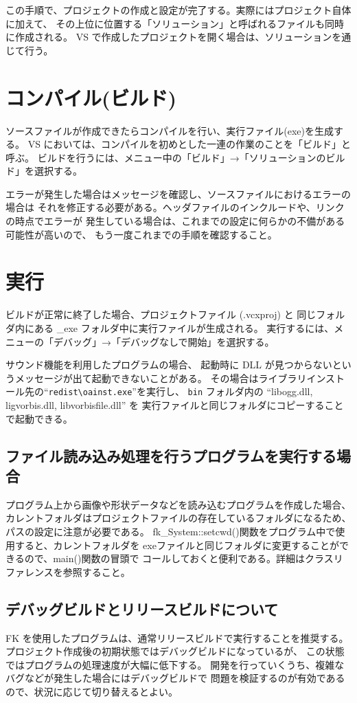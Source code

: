 \documentclass[a4j]{jarticle}
\begin{document}
この手順で、プロジェクトの作成と設定が完了する。実際にはプロジェクト自体に加えて、
その上位に位置する「ソリューション」と呼ばれるファイルも同時に作成される。
VS で作成したプロジェクトを開く場合は、ソリューションを通じて行う。


\section{コンパイル(ビルド)}
ソースファイルが作成できたらコンパイルを行い、実行ファイル(exe)を生成する。
VS においては、コンパイルを初めとした一連の作業のことを「ビルド」と呼ぶ。
ビルドを行うには、メニュー中の「ビルド」→「ソリューションのビルド」を選択する。

エラーが発生した場合はメッセージを確認し、ソースファイルにおけるエラーの場合は
それを修正する必要がある。ヘッダファイルのインクルードや、リンクの時点でエラーが
発生している場合は、これまでの設定に何らかの不備がある可能性が高いので、
もう一度これまでの手順を確認すること。


\section{実行}
ビルドが正常に終了した場合、プロジェクトファイル (.vcxproj) と
同じフォルダ内にある \_exe フォルダ中に実行ファイルが生成される。
実行するには、メニューの「デバッグ」→「デバッグなしで開始」を選択する。

サウンド機能を利用したプログラムの場合、
起動時に DLL が見つからないというメッセージが出て起動できないことがある。
その場合はライブラリインストール先の``\verb+redist\oainst.exe+''を実行し、
\verb+bin+ フォルダ内の ``libogg.dll, ligvorbis.dll, libvorbisfile.dll'' を
実行ファイルと同じフォルダにコピーすることで起動できる。

\subsection{ファイル読み込み処理を行うプログラムを実行する場合}
プログラム上から画像や形状データなどを読み込むプログラムを作成した場合、
カレントフォルダはプロジェクトファイルの存在しているフォルダになるため、
パスの設定に注意が必要である。
fk\_System::setcwd()関数をプログラム中で使用すると、カレントフォルダを
exeファイルと同じフォルダに変更することができるので、main()関数の冒頭で
コールしておくと便利である。詳細はクラスリファレンスを参照すること。

\subsection{デバッグビルドとリリースビルドについて}
FK を使用したプログラムは、通常リリースビルドで実行することを推奨する。
プロジェクト作成後の初期状態ではデバッグビルドになっているが、
この状態ではプログラムの処理速度が大幅に低下する。
開発を行っていくうち、複雑なバグなどが発生した場合にはデバッグビルドで
問題を検証するのが有効であるので、状況に応じて切り替えるとよい。
\end{document}
